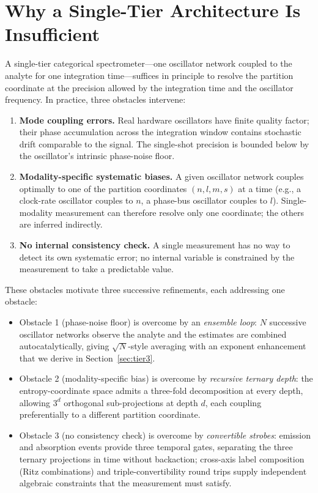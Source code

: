 \documentclass[11pt,a4paper]{article}
\theoremstyle{thmstyle}
\theoremstyle{axiomstyle}
\theoremstyle{definition}
\theoremstyle{remark}
\begin{document}
\section{Why a Single-Tier Architecture Is Insufficient}
\label{sec:whymultitier}

A single-tier categorical spectrometer---one oscillator network coupled to the analyte for one integration time---suffices in principle to resolve the partition coordinate at the precision allowed by the integration time and the oscillator frequency. In practice, three obstacles intervene:

\begin{enumerate}[nosep]
\item \textbf{Mode coupling errors.} Real hardware oscillators have finite quality factor; their phase accumulation across the integration window contains stochastic drift comparable to the signal. The single-shot precision is bounded below by the oscillator's intrinsic phase-noise floor.
\item \textbf{Modality-specific systematic biases.} A given oscillator network couples optimally to one of the partition coordinates $(n,l,m,s)$ at a time (e.g., a clock-rate oscillator couples to $n$, a phase-bus oscillator couples to $l$). Single-modality measurement can therefore resolve only one coordinate; the others are inferred indirectly.
\item \textbf{No internal consistency check.} A single measurement has no way to detect its own systematic error; no internal variable is constrained by the measurement to take a predictable value.
\end{enumerate}

These obstacles motivate three successive refinements, each addressing one obstacle:

\begin{itemize}[nosep]
\item Obstacle 1 (phase-noise floor) is overcome by an \emph{ensemble loop}: $N$ successive oscillator networks observe the analyte and the estimates are combined autocatalytically, giving $\sqrt{N}$-style averaging with an exponent enhancement that we derive in Section~\ref{sec:tier3}.
\item Obstacle 2 (modality-specific bias) is overcome by \emph{recursive ternary depth}: the entropy-coordinate space admits a three-fold decomposition at every depth, allowing $3^{d}$ orthogonal sub-projections at depth $d$, each coupling preferentially to a different partition coordinate.
\item Obstacle 3 (no consistency check) is overcome by \emph{convertible strobes}: emission and absorption events provide three temporal gates, separating the three ternary projections in time without backaction; cross-axis label composition (Ritz combinations) and triple-convertibility round trips supply independent algebraic constraints that the measurement must satisfy.
\end{itemize}
\end{document}
